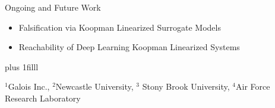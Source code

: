 \documentclass[shortpres,aspectratio=43]{beamer}
\newcommand{\btVFill}{\vskip0pt plus 1filll}
\begin{document}
\begin{frame}[fragile]
Ongoing and Future Work
\begin{itemize}
    \item Falsification via Koopman Linearized Surrogate Models
    \item Reachability of Deep Learning Koopman Linearized Systems
\end{itemize}

\btVFill
\begin{scriptsize}
$^1$Galois Inc., $^2$Newcastle University, $^3$ Stony Brook University, $^4$Air Force Research Laboratory
\end{scriptsize}
\end{frame}
\end{document}
